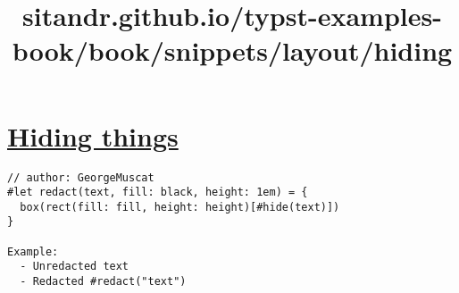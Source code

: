 \title{sitandr.github.io/typst-examples-book/book/snippets/layout/hiding}

\section{\texorpdfstring{\hyperref[hiding-things]{Hiding
things}}{Hiding things}}\label{hiding-things}

\begin{verbatim}
// author: GeorgeMuscat
#let redact(text, fill: black, height: 1em) = {
  box(rect(fill: fill, height: height)[#hide(text)])
}

Example:
  - Unredacted text
  - Redacted #redact("text")
\end{verbatim}

\pandocbounded{}

